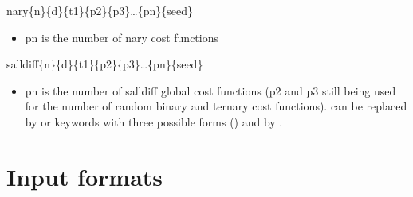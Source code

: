 \documentclass[letterpaper,10pt,openany,oneside,english]{sphinxmanual}
\begin{document}
\begin{description}
\begin{itemize}
\begin{itemize}
\end{itemize}

\sphinxAtStartPar
nary\sphinxhyphen{}\{n\}\sphinxhyphen{}\{d\}\sphinxhyphen{}\{t1\}\sphinxhyphen{}\{p2\}\sphinxhyphen{}\{p3\}…\sphinxhyphen{}\{pn\}\sphinxhyphen{}\{seed\}
\begin{itemize}
\item {} 
\sphinxAtStartPar
pn is the number of n\sphinxhyphen{}ary cost functions

\end{itemize}

\sphinxAtStartPar
salldiff\sphinxhyphen{}\{n\}\sphinxhyphen{}\{d\}\sphinxhyphen{}\{t1\}\sphinxhyphen{}\{p2\}\sphinxhyphen{}\{p3\}…\sphinxhyphen{}\{pn\}\sphinxhyphen{}\{seed\}
\begin{itemize}
\item {} 
\sphinxAtStartPar
pn is the number of salldiff global cost functions (p2 and
p3 still being used for the number of random binary and
ternary cost functions).  can be replaced by
 or  keywords with three possible forms
() and by .

\end{itemize}

\end{itemize}

\end{description}


\section{Input formats}
\label{\detokenize{userdoc:input-formats}}\label{\detokenize{userdoc:id56}}
\end{document}
